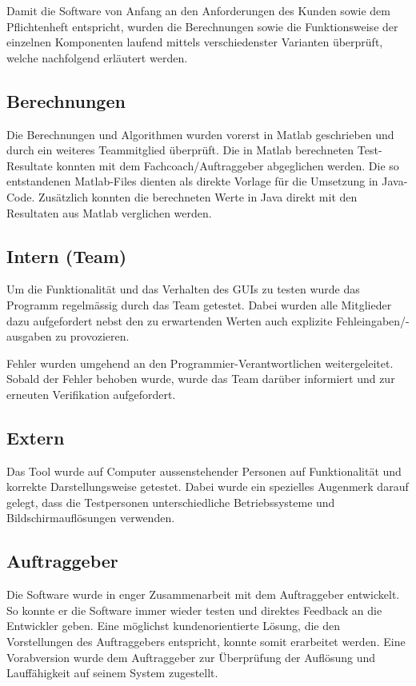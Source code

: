 Damit  die Software  von  Anfang an  den Anforderungen  des  Kunden sowie  dem
Pflichtenheft entspricht, wurden die Berechnungen sowie die Funktionsweise der
einzelnen Komponenten laufend mittels verschiedenster Varianten \"uberpr\"uft,
welche nachfolgend erl\"autert werden.

\subsection{Berechnungen}
Die  Berechnungen und  Algorithmen wurden  vorerst in  Matlab geschrieben  und
durch  ein  weiteres  Teammitglied \"uberpr\"uft. Die  in  Matlab  berechneten
Test-Resultate konnten mit  dem Fachcoach/Auftraggeber abgeglichen werden. Die
so entstandenen Matlab-Files  dienten als direkte Vorlage  f\"ur die Umsetzung
in Java-Code. Zus\"atzlich  konnten die berechneten  Werte in Java  direkt mit
den Resultaten aus Matlab verglichen werden.

\subsection{Intern (Team)}
Um  die  Funktionalit\"at   und  das  Verhalten  des  GUIs   zu  testen  wurde
das  Programm  regelm\"assig  durch   das  Team  getestet. Dabei  wurden  alle
Mitglieder dazu  aufgefordert nebst den  zu erwartenden Werten  auch explizite
Fehleingaben/-ausgaben zu provozieren.

Fehler     wurden     umgehend     an     den     Programmier-Verantwortlichen
weitergeleitet. Sobald  der Fehler  behoben  wurde, wurde  das Team  dar\"uber
informiert und zur erneuten Verifikation aufgefordert.

\subsection{Extern}
Das Tool wurde auf Computer  aussenstehender Personen auf Funktionalit\"at und
korrekte  Darstellungsweise  getestet. Dabei  wurde ein  spezielles  Augenmerk
darauf  gelegt, dass  die  Testpersonen  unterschiedliche Betriebssysteme  und
Bildschirmaufl\"osungen verwenden.


\subsection{Auftraggeber}
Die Software wurde in enger Zusammenarbeit mit dem Auftraggeber entwickelt. So
konnte  er  die  Software  immer   wieder  testen  und  direktes  Feedback  an
die  Entwickler   geben. Eine  m\"oglichst  kundenorientierte   L\"osung,  die
den  Vorstellungen  des  Auftraggebers  entspricht,  konnte  somit  erarbeitet
werden. Eine  Vorabversion  wurde  dem Auftraggeber  zur  \"Uberpr\"ufung  der
Aufl\"osung und Lauff\"ahigkeit auf seinem System zugestellt.
